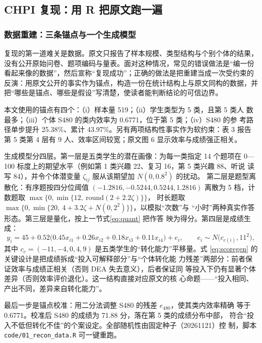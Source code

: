 \subsection{CHPI 复现：用 R 把原文跑一遍}

\subsubsection{数据重建：三条锚点与一个生成模型}

复现的第一道难关是数据。原文只报告了样本规模、类型结构与个别个体的结果，
没有公开原始问卷、题项编码与量表。面对这种情况，常见的错误做法是“编一份
看起来像的数据”，然后宣称“复现成功”；正确的做法是把重建当成一次受约束的
反演：用原文公开的事实作为锚点，构造一份在统计结构上与原文同构的数据，并
把“哪些是锚点、哪些是假设”写清楚，使读者能判断结论的可信边界。

本文使用的锚点有四个：（i）样本量 519；（ii）学生类型为 5 类，且第 5 类人
数最多；（iii）个体 S480 的类内效率为 0.6771，位于第 5 类；（iv）S480 的参
考路径单步提升 25.38\%、累计 43.97\%。另有两项结构性事实作为软约束：表 3
报告第 5 类第 4 层有 9 人、效率区间较宽；原文图 6 显示效率与成绩强正相关。

生成模型分四层。第一层是五类学生的潜在画像：为每一类指定 14 个题项在
0—100 标度上的期望水平（例如第 1 类兴趣 22、复习 16，第 5 类兴趣 88、听说
读写 84），并令个体潜变量 $\zeta_{ij}$ 服从该期望加 $N(0,0.8^2)$ 的扰动。
第二层是题型离散化：有序题按四分位阈值 $(-1.2816,-0.5244,0.5244,1.2816)$
离散为 5 档，计数题取 $\max\{0,\min\{12,\ \mathrm{round}(2+2.2\zeta)\}\}$，
时长题取 $\max\{0,\min\{20,\ 4+3.2\zeta+N(0,2^2)\}\}$，以模拟“次数”与
“小时”两种真实作答形态。第三层是量化，按上一节式\eqref{eq:quant} 把作答
映为得分。第四层是成绩生成：
\begin{equation}
y_i=45+0.52\bigl(0.45x_{i1}+0.26x_{i2}+0.18x_{i3}+0.11x_{i4}\bigr)+e_i,
\qquad e_i\sim N\bigl(c_{c(i)},11^2\bigr),
\label{eq:scoregen}
\end{equation}
其中 $c_{c}=(-11,-4,0,4,9)$ 是五类学生的“转化能力”平移量。式
\eqref{eq:scoregen} 的关键设计是把成绩拆成“投入可解释部分”与“个体转化能
力残差”两部分：前者保证效率与成绩正相关（否则 DEA 失去意义），后者保证同
等投入下仍有显著个体差异（否则效率评价退化）。这一结构直接对应原文的核
心命题——“投入相同、产出不同，差异来自转化能力”。

最后一步是锚点校准：用二分法调整 S480 的残差 $e_{480}$，使其类内效率精确
等于 0.6771。校准后 S480 的成绩为 71.88 分，落在第 5 类的成绩分布中部，
符合“投入不低但转化不佳”的个案设定。全部随机性由固定种子（20261121）控
制，脚本 \texttt{code/01\_recon\_data.R} 可一键重跑。

